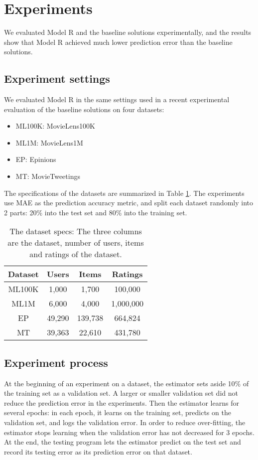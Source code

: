 \documentclass[sigconf]{acmart}
\begin{document}
\section{Experiments}
We evaluated Model R and the baseline solutions experimentally,
and the results show that Model R achieved much lower prediction error than 
the baseline solutions.

\subsection{Experiment settings}
We evaluated Model R in the same settings used in a recent experimental 
evaluation of the baseline solutions \cite{polatidis2016multi} on four datasets:
\begin{itemize}
	\item ML100K: MovieLens100K \cite{harper2015movielens}
	\item ML1M: MovieLens1M \cite{harper2015movielens}
	\item EP: Epinions \cite{massa2007trust}
	\item MT: MovieTweetings \cite{dooms2013movietweetings}
\end{itemize}
The specifications of the datasets are summarized in Table \ref{tab:dataset}.
The experiments use MAE as the prediction accuracy metric,
and split each dataset randomly into 2 parts: 20\% into the test set and 80\% 
into the training set.
\begin{table}[!htb]
	\centering
	\caption{The dataset specs: 
		The three columns are the dataset, number of users, items and ratings 
		of the dataset.
		}
	\begin{tabular}{cccc}  \hline
		Dataset & Users   & Items   & Ratings \\ \hline
		ML100K  & 1,000   & 1,700   & 100,000 \\ \hline
		ML1M    & 6,000   & 4,000   & 1,000,000 \\ \hline
		EP      & 49,290  & 139,738 & 664,824 \\ \hline
		MT      & 39,363  & 22,610  & 431,780 \\ \hline
	\end{tabular}
	\label{tab:dataset}
\end{table}

\subsection{Experiment process}
At the beginning of an experiment on a dataset,
the estimator sets aside 10\% of the training set as a validation set.
A larger or smaller validation set did not reduce the prediction error in the 
experiments.
Then the estimator learns for several epochs:
in each epoch,
it learns on the training set,
predicts on the validation set,
and logs the validation error.
In order to reduce over-fitting,
the estimator stops learning when the validation error has not decreased for 3 
epochs.
At the end, the testing program lets the estimator predict on the test set 
and record its testing error as its prediction error on that dataset.
\end{document}
